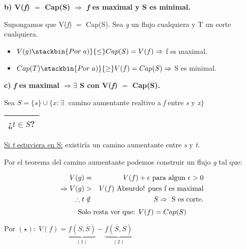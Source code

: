 \documentclass[12pt,a4paper]{report}
\begin{document}
			\textbf{b) V(\textit{f}) $=$ Cap(S) $\Rightarrow$ \textit{f} es maximal y S es minimal.}

				\vspace{2mm}
				\par Supongamos que V(\textit{f}) $=$ Cap(S). Sea \textit{g} un flujo cualquiera y T un corte cualquiera.
				\begin{itemize}
					\item $V(g) \stackbin{Por \; a)}{\leq} Cap(S) = V(f) \Rightarrow$ f es maximal.
					\item $Cap(T) \stackbin{Por \; a)}{\geq} V(f) = Cap(S) \Rightarrow$ S es minimal.
				\end{itemize}

			\vspace{5mm}
			\textbf{c) \textit{f} es maximal $\Rightarrow \exists$ S con V(\textit{f}) $=$ Cap(S).}

				\vspace{2mm}
				\par Sea $S = \{s\} \cup \{x : \exists \;$ camino aumentante realtivo a \textit{f} entre \textit{s} y \textit{x}$\}$

				\vspace{5mm}
				\begin{tabular}{|c|} \hline ¿$t \in S$? \\\hline \end{tabular}

					\vspace{3mm}
					\underline{Si \textit{t} estuviera en S:} existiría un camino aumentante entre \textit{s} y \textit{t}.
					\par Por el teorema del camino aumentante podemos construir un flujo \textit{g} tal que:

					\begin{eqnarray}
						\nonumber V(g) &=& V(f) + \epsilon \textup{ para algun } \epsilon > 0 \\
						\nonumber \Rightarrow V(g) &>& V(f) \textup{ Absurdo! pues f es maximal} \\
						\nonumber \therefore t &\notin & S \Rightarrow \textup{ S es corte.}
					\end{eqnarray}
					\[ \textup{Solo resta ver que: } V(f) = Cap(S) \]
					\par Por $(\star): \; V(f) =  \underbrace{f(S, \overline{S})}_{(1)} - \underbrace{f(\overline{S}, S)}_{(2)}$
\end{document}

